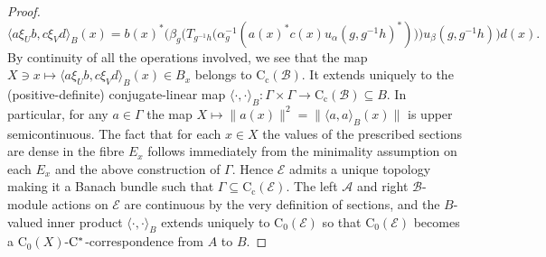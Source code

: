 \documentclass[10pt,a4paper]{amsart}
\newcommand{\A}{\mathcal A}
\newcommand{\B}{\mathcal B}
\newcommand{\EE}{\mathcal E}
\newcommand*{\contc}{\mathrm{C_c}}%
\newcommand*{\contz}{\mathrm{C_0}}%
\newcommand{\cst}{\ifmmode\mathrm{C}^*\else{$\mathrm{C}^*$}\fi}
\begin{document}
\begin{proof}
\[
    \langle a\xi_U b, c \xi_V d\rangle_{B} (x) = b(x)^* \Big( \beta_{g} \Big(T_{g^{-1} h} \big( \alpha_g^{-1}( a(x)^* c(x)u_{\alpha}(g,g^{-1}h)^*) \big) \Big)u_{\beta}(g,g^{-1}h)\Big) d(x). 
\]
By continuity of all the operations involved, we see that the map $X\ni x\mapsto \langle a\xi_U b, c \xi_V d\rangle_{B} (x) \in B_x$ belongs to $\contc(\B)$. 
It extends uniquely to the (positive-definite) conjugate-linear map $\langle \cdot, \cdot \rangle_{B}:\Gamma\times \Gamma \to \contc(\B)\subseteq B$. 
In particular, for any $a\in \Gamma$ the map $X\mapsto \|a(x)\|^2=\|\langle a, a \rangle_{B}(x)\|$ is upper semicontinuous.
The fact that for each $x \in X$ the values of the prescribed sections are dense in the fibre $E_x$ follows immediately from the minimality assumption on each $E_x$ and the above construction of $\Gamma$.
Hence $\EE$ admits a unique topology making it a Banach bundle  such that $\Gamma\subseteq \contc(\EE)$.
The left $\A$ and right $\B$-module actions on $\EE$ are continuous by the very definition of sections, and the $B$-valued inner product $\langle \cdot, \cdot \rangle_{B}$ extends uniquely to $\contz(\EE)$ so that $\contz(\EE)$ becomes a $\contz(X)$-$\cst$-correspondence from $A$ to $B$. 


\end{proof}
\end{document}
